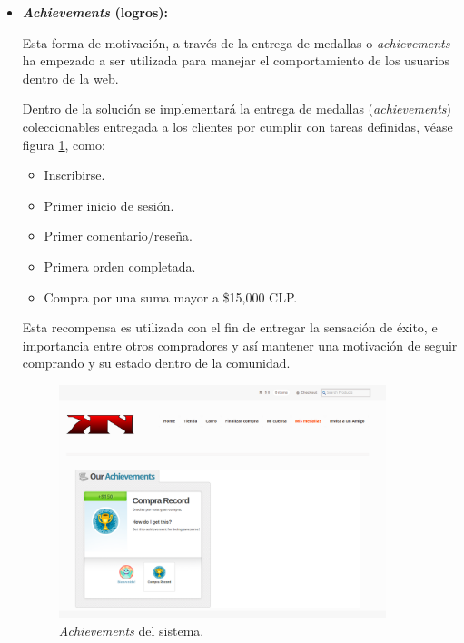 \begin{itemize}
    \item {\bf \emph{Achievements} (logros):}

	Esta forma de motivación, a través de la entrega de medallas o \emph{achievements}
	ha empezado a ser utilizada para manejar el comportamiento de los
	usuarios dentro de la web\cite{BehaviorBadges}.

        Dentro de la solución se implementará la entrega de medallas (\emph{achievements})
	coleccionables entregada a los clientes por cumplir con tareas definidas, véase
	figura \ref{fig:achievement}, como:

        \begin{itemize}
            \item Inscribirse.
            \item Primer inicio de sesión.
            \item Primer comentario/reseña.
            \item Primera orden completada.
            \item Compra por una suma mayor a \$15,000 CLP.
        \end{itemize}

        Esta recompensa es utilizada con el fin de entregar la sensación de éxito,
        e importancia entre otros compradores y así mantener una motivación
        de seguir comprando y su estado dentro de la comunidad.

\begin{figure}[!htb]
  \centering
  \includegraphics[width=0.9\textwidth]{images/Tienda/Tienda_achievement.png}
  \caption[Logros del sistema]{\emph{Achievements} del sistema.}
  \label{fig:achievement}
\end{figure}




\end{itemize}
